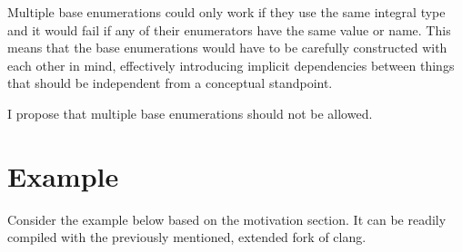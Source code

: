 \documentclass{scrartcl}
\begin{document}
Multiple base enumerations could only work if they use the same integral type
and it would fail if any of their enumerators have the same value or name.
This means that the base enumerations would have to be carefully constructed
with each other in mind, effectively introducing implicit dependencies between
things that should be independent from a conceptual standpoint.

I propose that multiple base enumerations should not be allowed.

\section{Example}
Consider the example below based on the motivation section.
It can be readily compiled with the previously mentioned, extended fork of clang.
\end{document}
